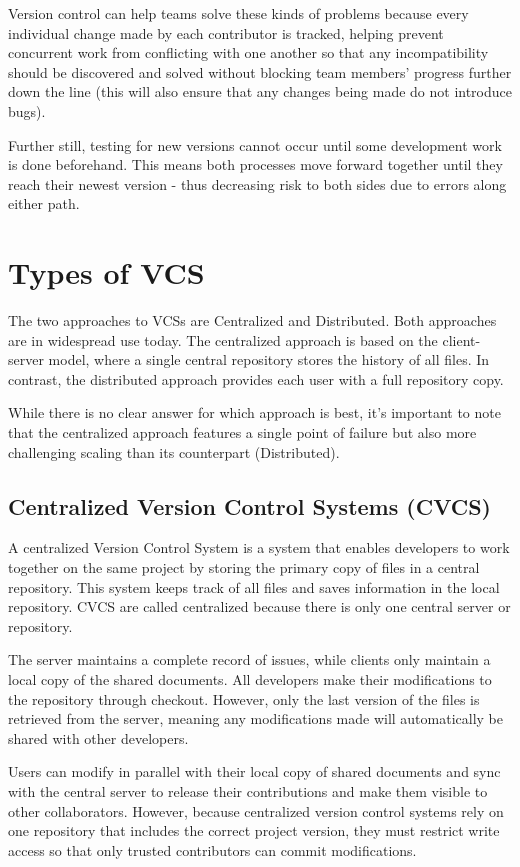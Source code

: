 Version control can help teams solve these kinds of problems because every individual change made by each contributor is tracked, helping prevent concurrent work from conflicting with one another so that any incompatibility should be discovered and solved without blocking team members' progress further down the line (this will also ensure that any changes being made do not introduce bugs).

Further still, testing for new versions cannot occur until some development work is done beforehand. This means both processes move forward together until they reach their newest version - thus decreasing risk to both sides due to errors along either path.
\section{Types of VCS}
The two approaches to VCSs are Centralized and Distributed. Both approaches are in widespread use today. The centralized approach is based on the client-server model, where a single central repository stores the history of all files. In contrast, the distributed approach provides each user with a full repository copy.

While there is no clear answer for which approach is best, it's important to note that the centralized approach features a single point of failure but also more challenging scaling than its counterpart (Distributed).

\subsection{Centralized Version Control Systems (CVCS)}
A centralized Version Control System is a system that enables developers to work together on the same project by storing the primary copy of files in a central repository. This system keeps track of all files and saves information in the local repository. CVCS are called centralized because there is only one central server or repository.

The server maintains a complete record of issues, while clients only maintain a local copy of the shared documents. All developers make their modifications to the repository through checkout. However, only the last version of the files is retrieved from the server, meaning any modifications made will automatically be shared with other developers.

Users can modify in parallel with their local copy of shared documents and sync with the central server to release their contributions and make them visible to other collaborators. However, because centralized version control systems rely on one repository that includes the correct project version, they must restrict write access so that only trusted contributors can commit modifications.

